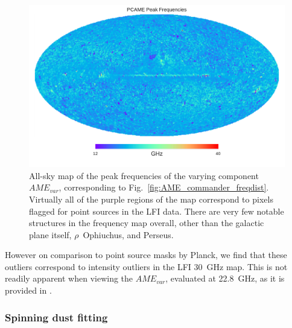            \begin{figure}
             \includegraphics[width=\textwidth]{../Plots/ch_datasources/PCAME_var_freq.pdf}
             \centering
             \caption{All-sky map of the peak frequencies of the varying component $AME_{var}$, corresponding to Fig.~\ref{fig:AME_commander_freqdist}. Virtually all of the purple regions of the map correspond to pixels flagged for point sources in the LFI data. There are very few notable structures in the frequency map overall, other than the galactic plane itself, $\rho$~Ophiuchus, and Perseus.}
             \label{fig:PCAME_var_freq}
           \end{figure}
            However on comparison to point source masks by Planck, we find that these outliers correspond to intensity outliers in the LFI 30~GHz map. This is not readily apparent when viewing the $AME_{var}$, evaluated at 22.8~GHz, as it is provided in \cite{planck15X}.

        \subsubsection{Spinning dust fitting}

